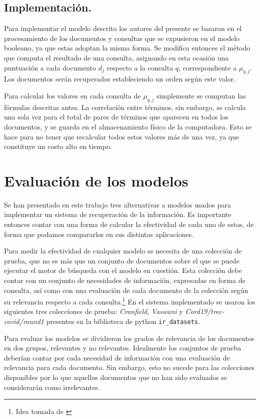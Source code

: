 \documentclass{llncs}
\begin{document}
	\subsection{Implementaci\'on.}
		Para implementar el modelo descrito los autores del presente se basaron en el procesamiento de los documentos y consultas que se expusieron en el modelo booleano, ya que estas adoptan la misma forma. Se modifica entonces el m\'etodo que computa el resultado de una consulta, asignando en esta ocasi\'on una puntuaci\'on a cada documento  $d_j$ respecto a la consulta $q$, correspondiente a $\mu_{q,j}$. Los documentos ser\'an recuperados estableciendo un orden seg\'un este valor.
		
		Para calcular los valores en cada consulta de $\mu_{q,j}$ simplemente se computan las f\'ormulas descritas antes. La correlaci\'on entre t\'erminos, sin embargo, se calcula una sola vez para el total de pares de t\'erminos que aparecen en todos los documentos, y se guarda en el almacenamiento f\'isico de la computadora. Esto se hace para no tener que recalcular todos estos valores m\'as de una vez, ya que constituye un costo alto en tiempo.
	
	\section{Evaluaci\'on de los modelos}
	
	Se han presentado en este trabajo tres alternativas a modelos usados para implementar un sistema de recuperaci\'on de la informaci\'on. Es importante entonces contar con una forma de calcular la efectividad de cada uno de estos, de forma que podamos compararlos en sus distintas aplicaciones.
	
	Para medir la efectividad de cualquier modelo se necesita de una colecci\'on de  prueba, que no es m\'as que un conjunto de documentos sobre el que se puede ejecutar el motor de b\'usqueda con el modelo en cuesti\'on. Esta colecci\'on debe contar con un conjunto de necesidades de informaci\'on, expresadas en forma de consulta, as\'i como con una evaluaci\'on de cada documento de la colecci\'on seg\'un su relevancia respecto a cada consulta.\footnote{Idea tomada de \cite[Secci\'on 8.1]{B1}} En el sistema implementado se usaron los siguientes tres colecciones de prueba: \emph{Cranfield}, \emph{Vaswani} y \emph{Cord19/trec-covid/round1} presentes en la biblioteca de python \texttt{ir\_datasets}.
	
	Para evaluar los modelos se dividieron los grados de relevancia de los documentos en dos grupos, relevantes y no relevantes. Idealmente los conjuntos de prueba deber\'ian contar por cada necesidad de informaci\'on con una evaluaci\'on de relevancia para cada documento. Sin embargo, esto no sucede para las colecciones disponibles por lo que  aquellos documentos que no han sido evaluados se considerar\'an como irrelevantes.
	
\end{document}
